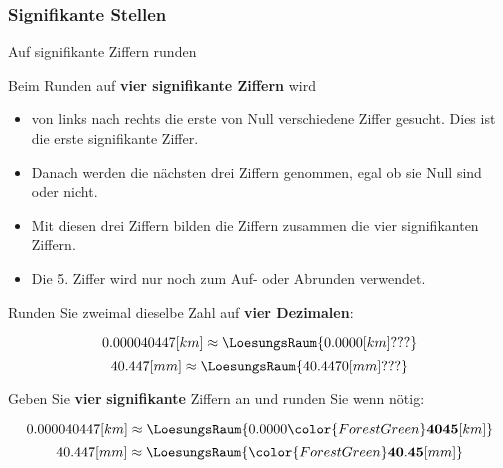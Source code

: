 


\newpage

\subsubsection{Signifikante Stellen}
\begin{rezept}{Auf signifikante Ziffern runden}{}
  
  Beim Runden auf \textbf{vier signifikante Ziffern} wird
  \begin{itemize}
  \item  von links nach rechts die erste von Null verschiedene Ziffer gesucht. Dies ist die
    erste signifikante Ziffer.
  \item
    Danach werden die nächsten drei Ziffern
  genommen, egal ob sie Null sind oder nicht. 
\item   Mit diesen drei Ziffern bilden die Ziffern zusammen die vier
  signifikanten Ziffern.
\item  Die 5. Ziffer wird nur noch zum Auf- oder Abrunden verwendet.
  \end{itemize}
\end{rezept}

Runden Sie zweimal dieselbe Zahl auf \textbf{vier Dezimalen}:
 
$$0.000040447 [km] \approx \LoesungsRaum{0.0000 [km] ???}$$
$$40.447      [mm] \approx \LoesungsRaum{40.4470 [mm] ???}$$

Geben Sie {\color{ForestGreen}\textbf{vier}} \textbf{signifikante} Ziffern an und runden Sie wenn nötig:
 
$$0.000040447 [km] \approx \LoesungsRaum{0.0000{\color{ForestGreen}\mathbf{4045}} [km]}$$
$$40.447      [mm] \approx \LoesungsRaum{{\color{ForestGreen}\mathbf{40.45}} [mm]}$$




\newpage


